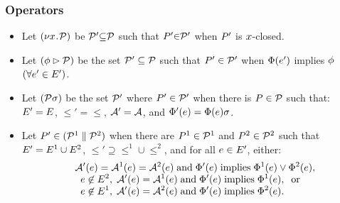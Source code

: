 \documentclass[t,aspectratio=169]{beamer} %
\begin{document}
\begin{frame}
  \frametitle{Operators}
  \begin{itemize}[<+->]
  \item 
    Let $(\nu x\!\mathbin.\!\mathcal{P})$ be  $\mathcal{P}'{\subseteq}\mathcal{P}$ such that $P'{\in}\mathcal{P}'$
    when $P'$ is $x$-closed.
  \item 
    Let $(\phi \mathbin\rhd \mathcal{P})$ be the set $\mathcal{P}'\subseteq\mathcal{P}$ such that
    $P'\in\mathcal{P}'$ when $\Phi(e')$ implies $\phi$
    $(\forall e'\in E')$. 
  \item 
    Let $(\mathcal{P}\sigma)$ be the set $\mathcal{P}'$ where $P'\in\mathcal{P}'$ when there is
    $P\in\mathcal{P}$ such that: $E' = E$, ${\le'} = {\le}$,
    $\mathcal{A}' = \mathcal{A}$, and
    $\Phi'(e) = \Phi(e)\sigma$.
    
    
  \item 
    Let $P' \in (\mathcal{P}^1 \parallel \mathcal{P}^2)$ when there are
    $P^1 \in \mathcal{P}^1$ and $P^2 \in \mathcal{P}^2$ such that
    $E' = E^1 \cup E^2$,
    ${\le'}\supseteq{\le^1}\cup{\le^2}$, and for all $e\in E'$, either:
    \begin{gather*}
      \begin{aligned}
        \;\;&\mathcal{A}'(e) = \mathcal{A}^1(e) = \mathcal{A}^2(e) \;\allowbreak\text{and}\allowbreak\; \Phi'(e) \; \allowbreak\text{implies}\allowbreak\; \Phi^1(e) \lor \Phi^2(e),\\[-1ex]
        &\;\;e \not\in E^2,\; \mathcal{A}'(e) = \mathcal{A}^1(e) \;\allowbreak\text{and}\allowbreak\; \Phi'(e) \; \allowbreak\text{implies}\allowbreak\; \Phi^1(e),\; \; \allowbreak\text{or}\allowbreak\;\\[-1ex]
        &\;\;e \not\in E^1,\; \mathcal{A}'(e) = \mathcal{A}^2(e) \;\allowbreak\text{and}\allowbreak\; \Phi'(e) \; \allowbreak\text{implies}\allowbreak\; \Phi^2(e).
      \end{aligned}
    \end{gather*}
  \end{itemize}
\end{frame}
\end{document}
